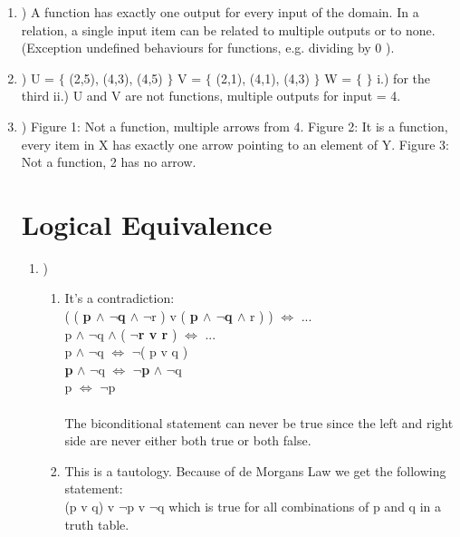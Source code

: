 \documentclass{article}
\begin{document}
\begin{enumerate}[label=\alph*]
	\item) A function has exactly one output for every input of the domain. In a relation, a single input item can be related to multiple outputs or to none. (Exception undefined behaviours for functions, e.g. dividing by 0 ). 
	\item) U = $\lbrace$ (2,5), (4,3), (4,5) $\rbrace$ V = $\lbrace$ (2,1), (4,1), (4,3) $\rbrace$ W = $\lbrace$  $\rbrace$
		i.) for the third
		ii.) U and V are not functions, multiple outputs for input = 4. 
	\item) Figure 1: Not a function, multiple arrows from 4. Figure 2: It is a function, every item in X has exactly one arrow pointing to an element of Y. Figure 3: Not a function, 2 has no arrow.


\section{Logical Equivalence}


\begin{enumerate}[label=\alph*]
	\item)
	\begin{enumerate}[label=\roman*]
	\item It's a contradiction:\\
	
	( ( \textbf{p $\land$ $\neg$q $\land$ } $\neg$r ) v ( \textbf{p $\land$ $\neg$q $\land$ } r ) ) $\Leftrightarrow$ ... \\
	p $\land$ $\neg$q $\land$ ( \textbf{$\neg$r v r }) $\Leftrightarrow$ ... \\
	p $\land$ $\neg$q $\Leftrightarrow$ $\neg$( p v q ) \\
	\textbf{p} $\land$ $\neg$q $\Leftrightarrow$ \textbf{$\neg$p} $\land$ $\neg$q \\
	p $\Leftrightarrow$ $\neg$p
	\\\\
	The biconditional statement can never be true since the left and right side are never either both true or both false.\\  
	\item This is a tautology. Because of de Morgans Law we get the following statement:\\
(p v q) v $\neg$p v $\neg$q which is true for all combinations of p and q in a truth table.

	\end{enumerate}



\end{enumerate}
\end{enumerate}
\end{document}
